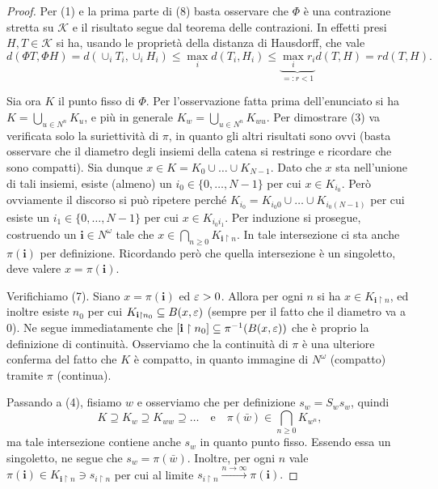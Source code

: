 \begin{proof}
	Per (1) e la prima parte di (8) basta osservare che $\Phi$ è una contrazione stretta su $\mathcal K$ e il risultato segue dal teorema delle contrazioni. In effetti presi $H,T\in \mathcal K$ si ha, usando le proprietà della distanza di Hausdorff, che vale 
	$$d(\Phi T, \Phi H) = d(\cup_{i}T_{i},\cup_{i}H_{i})\leq \max_{i}d(T_{i},H_{i}) \leq\underbrace{\max_{i}r_{i}}_{=:r<1}d(T,H)= rd(T,H).$$
	
	Sia ora $K$ il punto fisso di $\Phi$. Per l'osservazione fatta prima dell'enunciato si ha $K = \bigcup_{u\in N^{n}}K_{u}$, e più in generale $K_{w} = \bigcup_{u\in N^{n}}K_{wu}$. 
	Per dimostrare (3) va verificata solo la suriettività di $\pi$, in quanto gli altri risultati sono ovvi (basta osservare che il diametro degli insiemi della catena si restringe e ricordare che sono compatti). 
	Sia dunque $x\in K = K_{0}\cup\dots\cup K_{N-1}$. Dato che $x$ sta nell'unione di tali insiemi, esiste (almeno) un $i_{0}\in\{0,\dots,N-1\}$ per cui $x\in K_{i_{0}}$. 
	Però ovviamente il discorso si può ripetere perché $K_{i_{0}} = K_{i_{0}0}\cup\dots\cup K_{i_{0}(N-1)}$ per cui esiste un $i_{1}\in\{0,\dots,N-1\}$ per cui $x\in K_{i_{0}i_{1}}$. 
	Per induzione si prosegue, costruendo un $\mathbf i\in N^{\omega}$ tale che $x\in\bigcap_{n\geq0}K_{\mathbf i\upharpoonright n}$. 
	In tale intersezione ci sta anche $\pi(\mathbf i)$ per definizione. 
	Ricordando però che quella intersezione è un singoletto, deve valere $x = \pi(\mathbf i)$.
	
	Verifichiamo (7). Siano $x = \pi(\mathbf i)$ ed $\varepsilon>0$. Allora per ogni $n$ si ha $x\in K_{\mathbf i \upharpoonright n}$, ed inoltre esiste $n_{0}$ per cui $K_{\mathbf i \upharpoonright n_{0}}\subseteq B(x,\varepsilon)$ (sempre per il fatto che il diametro va a 0). 
	Ne segue immediatamente che $[\mathbf i\upharpoonright n_{0}]\subseteq \pi^{-1}(B(x,\varepsilon))$ che è proprio la definizione di continuità. 
	Osserviamo che la continuità di $\pi$ è una ulteriore conferma del fatto che $ K$ è compatto, in quanto immagine di $N^{\omega}$ (compatto) tramite $\pi$ (continua).
	
	Passando a (4), fisiamo $w$ e osserviamo che per definizione $s_{w} = S_{w}s_{w}$, quindi 
	$$K\supseteq K_{w}\supseteq K_{ww}\supseteq \dots\quad\text{e}\quad \pi(\bar w) \in \bigcap_{n\geq0}K_{w^{n}},$$
	ma tale intersezione contiene anche $s_{w}$ in quanto punto fisso. Essendo essa un singoletto, ne segue che $s_{w} = \pi(\bar w)$.
	Inoltre, per ogni $n$ vale $\pi(\mathbf i) \in K_{\mathbf i\upharpoonright n}\ni s_{i\upharpoonright n}$ per cui al limite $s_{i\upharpoonright n}\xrightarrow{n\to\infty}\pi(\mathbf i).$
	

\end{proof}
